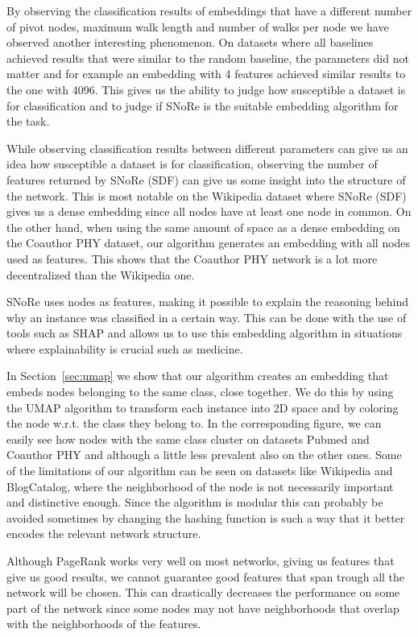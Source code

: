 \documentclass[twoside,11pt]{article}
\begin{document}
By observing the classification results of embeddings that have a different number of pivot nodes, maximum walk length and number of walks per node we have observed another interesting phenomenon. On datasets where all baselines achieved results that were similar to the random baseline, the parameters did not matter and for example an embedding with 4 features achieved similar results to the one with 4096. This gives us the ability to judge how susceptible a dataset is for classification and to judge if SNoRe is the suitable embedding algorithm for the task. 

While observing classification results between different parameters can give us an idea how susceptible a dataset is for classification, observing the number of features returned by SNoRe (SDF) can give us some insight into the structure of the network. This is most notable on the Wikipedia dataset where SNoRe (SDF) gives us a dense embedding since all nodes have at least one node in common. On the other hand, when using the same amount of space as a dense embedding on the Coauthor PHY dataset, our algorithm generates an embedding with all nodes used as features. This shows that the Coauthor PHY network is a lot more decentralized than the Wikipedia one.

SNoRe uses nodes as features, making it possible to explain the reasoning behind why an instance was classified in a certain way. This can be done with the use of tools such as SHAP and allows us to use this embedding algorithm in situations where explainability is crucial such as medicine.

In Section~\ref{sec:umap} we show that our algorithm creates an embedding that embeds nodes belonging to the same class, close together. We do this by using the UMAP algorithm to transform each instance into 2D space and by coloring the node w.r.t. the class they belong to. In the corresponding figure, we can easily see how nodes with the same class cluster on datasets Pubmed and Coauthor PHY and although a little less prevalent also on the other ones.    
Some of the limitations of our algorithm can be seen on datasets like Wikipedia and BlogCatalog, where the neighborhood of the node is not necessarily important and distinctive enough. Since the algorithm is modular this can probably be avoided sometimes by changing the hashing function is such a way that it better encodes the relevant network structure.

Although PageRank works very well on most networks, giving us features that give us good results, we cannot guarantee good features that span trough all the network will be chosen. This can drastically decreases the performance on some part of the network since some nodes may not have neighborhoods that overlap with the neighborhoods of the features.  
\end{document}
